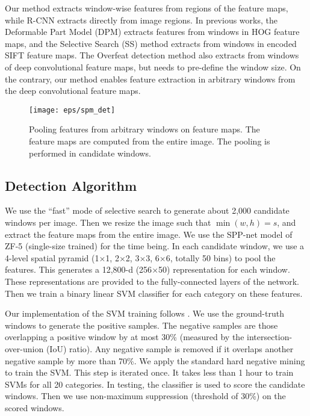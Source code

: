 \documentclass[10pt,journal,cspaper,compsoc]{IEEEtran}
\begin{document}
Our method extracts window-wise features from regions of the feature maps, while R-CNN extracts directly from image regions. In previous works, the Deformable Part Model (DPM) \cite{Felzenszwalb2010} extracts features from windows in HOG \cite{Dalal2005} feature maps, and the Selective Search (SS) method \cite{Sande2011} extracts from windows in encoded SIFT feature maps. The Overfeat detection method \cite{Sermanet2013} also extracts from windows of deep convolutional feature maps, but needs to pre-define the window size. On the contrary, our method enables feature extraction in arbitrary windows from the deep convolutional feature maps.

\begin{figure}[t]
\center
\texttt{[image: eps/spm\_det]}
\caption{Pooling features from arbitrary windows on feature maps. The feature maps are computed from the entire image. The pooling is performed in candidate windows.}
\label{fig:spm_det}
\end{figure}

\subsection{Detection Algorithm}

We use the ``fast'' mode of selective search \cite{Sande2011} to generate about 2,000 candidate windows per image. Then we resize the image such that $\min(w,h)=s$, and extract the feature maps from the entire image. We use the SPP-net model of ZF-5 (single-size trained) for the time being. In each candidate window, we use a 4-level spatial pyramid (1$\times$1, 2$\times$2, 3$\times$3, 6$\times$6, totally 50 bins) to pool the features. This generates a 12,800-d (256$\times$50) representation for each window. These representations are provided to the fully-connected layers of the network.
Then we train a binary linear SVM classifier for each category on these features.

Our implementation of the SVM training follows \cite{Sande2011,Girshick2014}. We use the ground-truth windows to generate the positive samples. The negative samples are those overlapping a positive window by at most 30\% (measured by the intersection-over-union (IoU) ratio). Any negative sample is removed if it overlaps another negative sample by more than 70\%. We apply the standard hard negative mining \cite{Felzenszwalb2010} to train the SVM. This step is iterated once. It takes less than 1 hour to train SVMs for all 20 categories.
In testing, the classifier is used to score the candidate windows. Then we use non-maximum suppression \cite{Felzenszwalb2010} (threshold of 30\%) on the scored windows.
\end{document}
